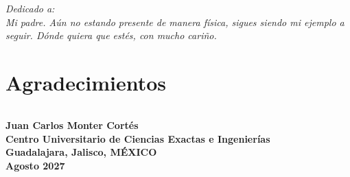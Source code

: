 \documentclass[letterpaper,12pt,oneside]{book}
\begin{document}
\chapter*{}

\vspace*{5cm}
{\Large
\textit{Dedicado a:\\
\begin{equation*}
  \mbox{ }
\end{equation*}
Mi padre. Aún no estando presente de manera física, sigues siendo mi ejemplo a seguir. Dónde quiera que estés, con mucho cariño. }}
\vspace*{\fill}

\chapter*{Agradecimientos}


\begin{equation*}
\mbox{ }
\end{equation*}

\begin{flushright}
\textbf{Juan Carlos Monter Cortés\\
Centro Universitario de Ciencias Exactas e Ingenierías\\
Guadalajara, Jalisco, MÉXICO\\
Agosto 2027}\par
\end{flushright}


\tableofcontents
















\end{document}
